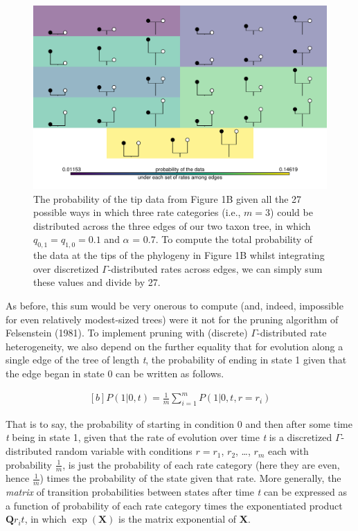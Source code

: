 \documentclass[fleqn,10pt,lineno]{wlpeerj} %
\begin{document}
\begin{figure}
\includegraphics[width=1\linewidth]{Revell-and-Harmon.fitgammaMk.PeerJ_files/figure-latex/unnamed-chunk-3-1} \caption{The probability of the tip data from Figure 1B given all the 27 possible ways in which three rate categories (i.e., $m = 3$) could be distributed across the three edges of our two taxon tree, in which $q_{0,1} = q_{1,0} = 0.1$ and $\alpha$ = 0.7. To compute the total probability of the data at the tips of the phylogeny in Figure 1B whilst integrating over discretized $\Gamma$-distributed rates across edges, we can simply sum these values and divide by 27.}\label{fig:unnamed-chunk-3}
\end{figure}

As before, this sum would be very onerous to compute (and, indeed, impossible for even relatively modest-sized trees) were it not for the pruning algorithm of Felsenstein (1981). To implement pruning with (discrete) \(\Gamma\)-distributed rate heterogeneity, we also depend on the further equality that for evolution along a single edge of the tree of length \emph{t}, the probability of ending in state 1 given that the edge began in state 0 can be written as follows.

\begin{equation}
\begin{aligned}[b]
P(1|0,t) = \frac{1}{m} \displaystyle\sum_{i=1}^{m} P(1|0,t,r=r_{i})
\end{aligned}
\end{equation}

That is to say, the probability of starting in condition 0 and then after some time \emph{t} being in state 1, given that the rate of evolution over time \emph{t} is a discretized \(\Gamma\)-distributed random variable with conditions \(r = r_{1}\), \(r_{2}\), \ldots, \(r_{m}\) each with probability \(\frac{1}{m}\), is just the probability of each rate category (here they are even, hence \(\frac{1}{m}\)) times the probability of the state given that rate. More generally, the \emph{matrix} of transition probabilities between states after time \emph{t} can be expressed as a function of probability of each rate category times the exponentiated product \(\mathbf{Q}r_{i}t\), in which \(\exp(\mathbf{X})\) is the matrix exponential of \textbf{X}.
\end{document}
